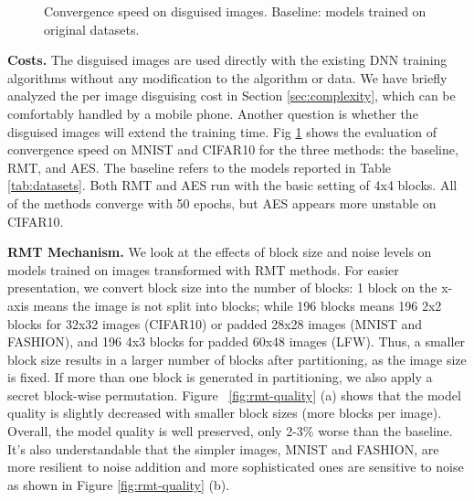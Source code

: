 \documentclass[conference]{IEEEtran}
\begin{document}
\begin{figure}
{
	}
 	\caption{Convergence speed on disguised images. Baseline: models trained on original datasets.}
 	\label{fig:convergence}
\end{figure}


\textbf{Costs.} The disguised images are used directly with the existing DNN training algorithms without any modification to the algorithm or data. We have briefly analyzed the per image disguising cost in Section \ref{sec:complexity}, which can be comfortably handled by a mobile phone. Another question is whether the disguised images will extend the training time. Fig \ref{fig:convergence} shows the evaluation of convergence speed on MNIST and CIFAR10 for the three methods: the baseline, RMT, and AES. The baseline refers to the models reported in Table \ref{tab:datasets}. Both RMT and AES run with the basic setting of 4x4 blocks. All of the methods converge with 50 epochs, but AES appears more unstable on CIFAR10. 

\textbf{RMT Mechanism.} We look at the effects of block size and noise levels  on models trained on images transformed with RMT methods. For easier presentation, we  convert block size into the number of blocks: 1 block on the x-axis means the image is not split into blocks; while 196 blocks means 196 2x2 blocks for 32x32 images (CIFAR10) or padded 28x28 images (MNIST and FASHION), and 196 4x3 blocks for padded 60x48 images (LFW). Thus, a smaller block size results in a larger number of blocks after partitioning, as the image size is fixed. If more than one block is generated in partitioning, we also apply a secret block-wise permutation.
Figure ~\ref{fig:rmt-quality} (a) shows that the model quality is slightly decreased with smaller block sizes (more blocks per image). Overall, the model quality is well preserved, only 2-3\% worse than the baseline. It's also understandable that the simpler images, MNIST and FASHION, are more resilient to noise addition and more sophisticated ones are sensitive to noise as shown in Figure \ref{fig:rmt-quality} (b). %
\end{document}
